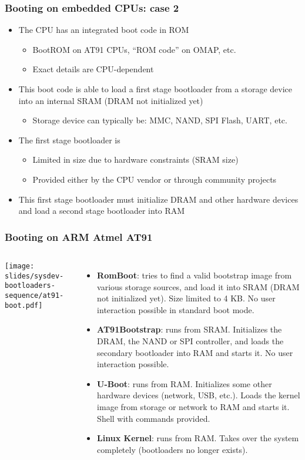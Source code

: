 \begin{frame}
  \frametitle{Booting on embedded CPUs: case 2}
  \begin{itemize}
  \item The CPU has an integrated boot code in ROM
    \begin{itemize}
    \item BootROM on AT91 CPUs, “ROM code” on OMAP, etc.
    \item Exact details are CPU-dependent
    \end{itemize}
  \item This boot code is able to load a first stage bootloader from a
    storage device into an internal SRAM (DRAM not initialized yet)
    \begin{itemize}
    \item Storage device can typically be: MMC, NAND, SPI Flash, UART,
      etc.
    \end{itemize}
  \item The first stage bootloader is
    \begin{itemize}
    \item Limited in size due to hardware constraints (SRAM size)
    \item Provided either by the CPU vendor or through community projects
    \end{itemize}
  \item This first stage bootloader must initialize DRAM and other
    hardware devices and load a second stage bootloader into RAM
  \end{itemize}
\end{frame}

\begin{frame}
  \frametitle{Booting on ARM Atmel AT91}
  \begin{columns}
    \texttt{[image: slides/sysdev-bootloaders-sequence/at91-boot.pdf]}
    \footnotesize
    \begin{itemize}
    \item {\bf RomBoot}: tries to find a valid bootstrap image from
      various storage sources, and load it into SRAM (DRAM not
      initialized yet). Size limited to 4 KB. No user interaction
      possible in standard boot mode.
    \item {\bf AT91Bootstrap}: runs from SRAM. Initializes the DRAM,
      the NAND or SPI controller, and loads the secondary bootloader
      into RAM and starts it. No user interaction possible.
    \item {\bf U-Boot}: runs from RAM. Initializes some other hardware
      devices (network, USB, etc.).  Loads the kernel image from
      storage or network to RAM and starts it. Shell with commands
      provided.
    \item {\bf Linux Kernel}: runs from RAM. Takes over the system
      completely (bootloaders no longer exists).
    \end{itemize}
  \end{columns}
\end{frame}

